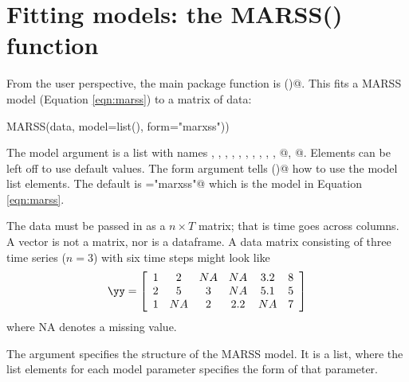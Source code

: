 \chapter{Fitting models: the MARSS() function}\label{chap:MARSS}

From the user perspective, the main package function is \verb@MARSS()@.  This fits a MARSS model (Equation \ref{eqn:marss}) to a matrix of data:
\begin{Schunk}
\begin{Sinput}
MARSS(data, model=list(), form="marxss")) 
\end{Sinput}
\end{Schunk}
The model argument is a list with names \verb@B@, \verb@U@, \verb@C@, \verb@c@, \verb@Q@, \verb@Z@, \verb@A@, \verb@D@, \verb@d@, \verb@R@, @, @.  Elements can be left off to use default values.  The form argument tells \verb@MARSS()@ how to use the model list elements.  The default is \verb@form="marxss"@ which is the model in Equation \ref{eqn:marss}.

The data must be passed in as a $n \times T$ matrix; that is time goes across columns.  A vector is not a matrix, nor is a dataframe. A data matrix consisting of three time series ($n=3$) with six time steps might look like
\begin{equation*}
\yy = \left[ \begin{array}{ccccccc}
    1 & 2 & NA & NA & 3.2 & 8\\
    2 & 5 &  3 & NA & 5.1 & 5\\
    1 & NA & 2 & 2.2 & NA & 7\end{array} \right]
\end{equation*}
where NA denotes a missing value.

The argument \verb@model@ specifies the structure of the MARSS model.  It is a list, where the list elements for each model parameter specifies the form of that parameter.  


